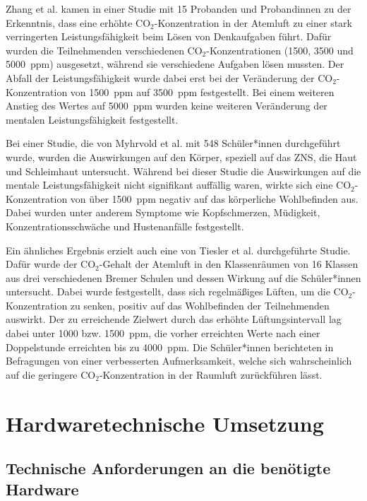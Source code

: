 \documentclass[a4paper,
    11pt,
    headings=small,
    ngerman,
    listof=totoc,
    numbers=noenddot]{scrreprt}[2021/11/13]
\begin{document}
Zhang et al. \autocite{zhang} kamen in einer Studie mit 15 Probanden und Probandinnen zu der Erkenntnis, dass eine erhöhte CO$_2$-Konzentration in der Atemluft zu einer stark verringerten Leistungsfähigkeit beim Lösen von Denkaufgaben führt. Dafür wurden die  Teilnehmenden verschiedenen CO$_2$-Konzentrationen (\si{1500}, \si{3500} und \SI{5000}{\ac{ppm}}) ausgesetzt, während sie verschiedene Aufgaben lösen mussten. Der Abfall der Leistungsfähigkeit wurde dabei erst bei der Veränderung der CO$_2$-Konzentration von \SI{1500}{\ac{ppm}} auf \SI{3500}{\ac{ppm}} festgestellt. Bei einem weiteren Anstieg des Wertes auf \SI{5000}{\ac{ppm}} wurden keine weiteren Veränderung der mentalen Leistungsfähigkeit festgestellt.

Bei einer Studie, die von Myhrvold et al. \autocite{myhrvold} mit 548 Schüler*innen durchgeführt wurde, wurden die Auswirkungen auf den Körper, speziell auf das \ac{ZNS}, die Haut und Schleimhaut untersucht. Während bei dieser Studie die Auswirkungen auf die mentale Leistungsfähigkeit nicht signifikant auffällig waren, wirkte sich eine CO$_2$-Konzentration von über \SI{1500}{\ac{ppm}} negativ auf das körperliche Wohlbefinden aus. Dabei wurden unter anderem Symptome wie Kopfschmerzen, Müdigkeit, Konzentrationsschwäche und Hustenanfälle festgestellt.

Ein ähnliches Ergebnis erzielt auch eine von Tiesler et al. \autocite{tiesler} durchgeführte Studie. Dafür wurde der CO$_2$-Gehalt der Atemluft in den Klassenräumen von 16 Klassen aus drei verschiedenen Bremer Schulen und dessen Wirkung auf die Schüler*innen untersucht. Dabei wurde festgestellt, dass sich regelmäßiges Lüften, um die CO$_2$-Konzentration zu senken, positiv auf das Wohlbefinden der  Teilnehmenden auswirkt. Der zu erreichende Zielwert durch das erhöhte Lüftungsintervall lag dabei unter \si{1000} bzw. \SI{1500}{\ac{ppm}}, die vorher  erreichten Werte nach einer Doppelstunde erreichten bis zu \SI{4000}{\ac{ppm}}. Die Schüler*innen berichteten in Befragungen von einer verbesserten Aufmerksamkeit, welche sich wahrscheinlich auf die geringere CO$_2$-Konzentration in der Raumluft zurückführen lässt.



\chapter{Hardwaretechnische Umsetzung}


\section{Technische Anforderungen an die benötigte Hardware}
\end{document}
